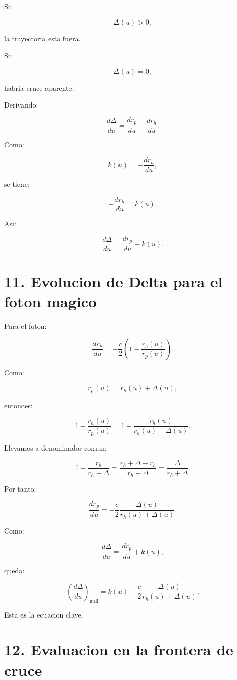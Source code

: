 ﻿\documentclass[11pt,a4paper]{article}
\begin{document}
Si:

\[
\Delta(u)>0,
\]

la trayectoria esta fuera.

Si:

\[
\Delta(u)=0,
\]

habria cruce aparente.

Derivando:

\[
\frac{d\Delta}{du}
=
\frac{dr_p}{du}
-
\frac{dr_h}{du}.
\]

Como:

\[
k(u)=-\frac{dr_h}{du},
\]

se tiene:

\[
-\frac{dr_h}{du}=k(u).
\]

Asi:

\[
\frac{d\Delta}{du}
=
\frac{dr_p}{du}
+
k(u).
\]

\section{11. Evolucion de Delta para el foton magico}

Para el foton:

\[
\frac{dr_p}{du}
=
-
\frac{c}{2}
\left(
1-\frac{r_h(u)}{r_p(u)}
\right).
\]

Como:

\[
r_p(u)=r_h(u)+\Delta(u),
\]

entonces:

\[
1-\frac{r_h(u)}{r_p(u)}
=
1-\frac{r_h(u)}{r_h(u)+\Delta(u)}.
\]

Llevamos a denominador comun:

\[
1-\frac{r_h}{r_h+\Delta}
=
\frac{r_h+\Delta-r_h}{r_h+\Delta}
=
\frac{\Delta}{r_h+\Delta}.
\]

Por tanto:

\[
\frac{dr_p}{du}
=
-
\frac{c}{2}
\frac{\Delta(u)}{r_h(u)+\Delta(u)}.
\]

Como:

\[
\frac{d\Delta}{du}
=
\frac{dr_p}{du}
+
k(u),
\]

queda:

\[
\left(
\frac{d\Delta}{du}
\right)_{\mathrm{null}}
=
k(u)
-
\frac{c}{2}
\frac{\Delta(u)}{r_h(u)+\Delta(u)}.
\]

Esta es la ecuacion clave.

\section{12. Evaluacion en la frontera de cruce}
\end{document}
